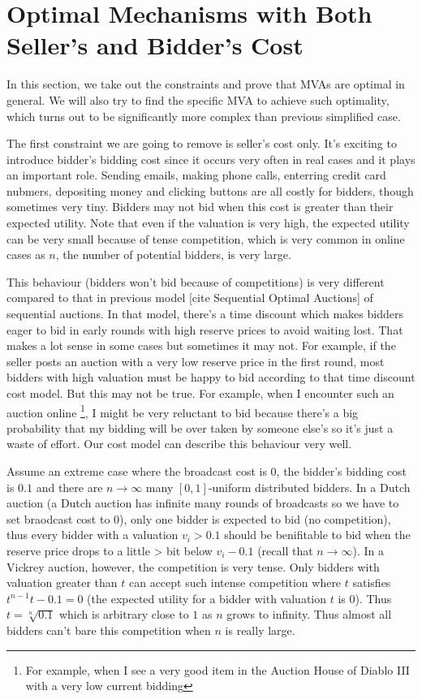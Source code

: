 \section{Optimal Mechanisms with Both Seller's and Bidder's Cost}

In this section, we take out the constraints and prove that MVAs are optimal in
general. We will also try to find the specific MVA to achieve such optimality,
which turns out to be significantly more complex than previous
simplified case.

The first constraint we are going to remove is seller's cost only.  It's
exciting to introduce bidder's bidding cost since it occurs very often in real
cases and it plays an important role.  Sending emails, making phone calls,
enterring credit card nubmers, depositing money and clicking buttons are all
costly for bidders, though sometimes very tiny.  Bidders may not bid when this
cost is greater than their expected utility. Note that even if the valuation is
very high, the expected utility can be very small because of tense competition,
which is very common in online cases as $n$, the number of potential bidders,
is very large. 

This behaviour (bidders won't bid because of competitions) is very different
compared to that in previous model [cite Sequential Optimal Auctions] of
sequential auctions. In that model, there's a time discount which
makes bidders eager to bid in early rounds with high reserve prices to avoid
waiting lost. That makes a lot sense in some cases but sometimes it may not.
For example, if the seller posts an auction with a very low reserve price in
the first round, most bidders with high valuation must be happy to bid
according to that time discount cost model. But this may not be true. For
example, when I encounter such an auction online \footnote{For example, when I
see a very good item in the Auction House of Diablo III with a very low current
bidding}, I might be very reluctant to bid because there's a big probability
that my bidding will be over taken by someone else's so it's just a waste of
effort. Our cost model can describe this behaviour very well.

Assume an extreme case where the broadcast cost is $0$, the bidder's bidding
cost is $0.1$ and there are $n \rightarrow \infty$ many $[0, 1]$-uniform
distributed bidders. In a Dutch auction (a Dutch auction has infinite many
rounds of broadcasts so we have to set braodcast cost to $0$), only one bidder
is expected to bid (no competition), thus every bidder with a valuation $v_i
> 0.1$ should be benifitable to bid when the reserve price drops to a little
> bit below
$v_i-0.1$ (recall that $n \rightarrow \infty$).  In a Vickrey auction, however,
the competition is very tense. Only bidders with valuation greater than $t$ can
accept such intense competition where $t$ satisfies $t^{n-1}t - 0.1 = 0$ (the
expected utility for a bidder with valuation $t$ is $0$).  Thus $t =
\sqrt[n]{0.1}$ which is arbitrary close to $1$ as $n$ grows to infinity.  Thus
almost all bidders can't bare this competition when $n$ is really large.

